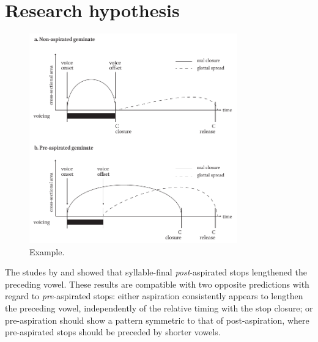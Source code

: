 \documentclass[11pt,a4paper,openany]{memoir}\usepackage[]{graphicx}\usepackage[]{color}
\begin{document}


\section{Research hypothesis}
\label{s:hypothesis}

\begin{figure}
\centering
\includegraphics[width=0.8\textwidth]{hypothesis}
\caption{Example.}
\label{f:hypothesis}
\end{figure}


The studes by \citet{maddieson1976} and \citet{durvasula2012} showed that syllable-final \textit{post}-aspirated stops lengthened the preceding vowel.
These results are compatible with two opposite predictions with regard to \textit{pre}-aspirated stops: either aspiration consistently appears to lengthen the preceding vowel, independently of the relative timing with the stop closure; or pre-aspiration should show a pattern symmetric to that of post-aspiration, where pre-aspirated stops should be preceded by shorter vowels.
\end{document}
